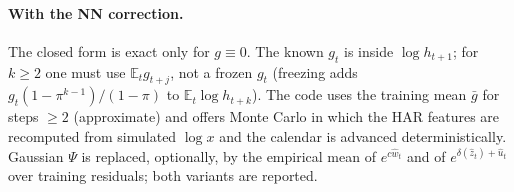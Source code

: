 \documentclass[11pt]{article}
\newcommand{\E}{\mathbb{E}}
\begin{document}
\paragraph{With the NN correction.} The closed form is exact only for $g\equiv0$. The known
$g_t$ is inside $\log h_{t+1}$; for $k\ge2$ one must use $\E_t g_{t+j}$, not a frozen $g_t$
(freezing adds $g_t(1-\pi^{k-1})/(1-\pi)$ to $\E_t\log h_{t+k}$). The code uses the training
mean $\bar g$ for steps $\ge2$ (approximate) and offers Monte Carlo in which the HAR features
are recomputed from simulated $\log x$ and the calendar is advanced deterministically.
Gaussian $\Psi$ is replaced, optionally, by the empirical mean of $e^{c\hat w_t}$ and of
$e^{\delta(\hat z_t)+\hat u_t}$ over training residuals; both variants are reported.

\end{document}
